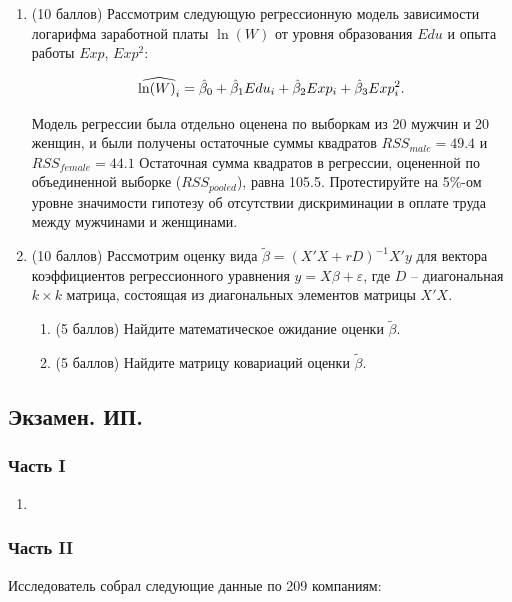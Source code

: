 \begin{enumerate}
\item (10 баллов) Рассмотрим следующую регрессионную модель зависимости логарифма заработной платы $\ln (W)$ от уровня образования $Edu$ и опыта работы $Exp$, $Exp^2$:
 
\[
\widehat{\ln (W)_i} = \hat{\beta}_0 + \hat{\beta}_1 Edu_i + \hat{\beta}_2 Exp_i + \hat{\beta}_3 Exp^2_i.
\]

Модель регрессии была отдельно оценена по выборкам из 20 мужчин и 20 женщин, и
были получены остаточные суммы квадратов $RSS_{male} = 49.4$ и $RSS_{female} = 44.1$ Остаточная сумма квадратов в регрессии, оцененной по объединенной выборке ($RSS_{pooled}$), равна 105.5. Протестируйте на 5\%-ом уровне значимости гипотезу об отсутствии дискриминации в оплате труда между мужчинами и женщинами.

\item (10 баллов) Рассмотрим оценку вида $\tilde\beta = (X'X+rD)^{-1}X'y$ для вектора коэффициентов регрессионного уравнения $y = X\beta + \varepsilon$, где $D$ – диагональная $k \times k$ матрица, состоящая из диагональных элементов матрицы $X'X$.

\begin{enumerate}
\item (5 баллов) Найдите математическое ожидание оценки $\tilde\beta$.
\item (5 баллов) Найдите матрицу ковариаций оценки $\tilde\beta$.
\end{enumerate}
\end{enumerate}

\subsection{Экзамен. ИП.}





\subsubsection*{Часть I}

\begin{enumerate}
    \item 
\end{enumerate}


\subsubsection*{Часть II}

Исследователь собрал следующие данные по 209 компаниям:

